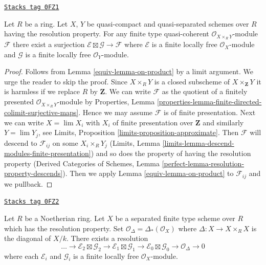\begin{lemma}
\label{equiv-lemma-on-product-general}
\href{https://stacks.math.columbia.edu/tag/0FZ1}{\texttt{Stacks tag 0FZ1}}

Let $R$ be a ring. Let $X$, $Y$ be quasi-compact and quasi-separated
schemes over $R$ having the resolution property. For any finite
type quasi-coherent $\mathcal{O}_{X \times_R Y}$-module $\mathcal{F}$
there exist a surjection $\mathcal{E} \boxtimes \mathcal{G} \to \mathcal{F}$
where $\mathcal{E}$ is a finite locally free $\mathcal{O}_X$-module
and $\mathcal{G}$ is a finite locally free $\mathcal{O}_Y$-module.
\end{lemma}

\begin{proof}

Follows from Lemma \ref{equiv-lemma-on-product} by a limit argument.
We urge the reader to skip the proof.
Since $X \times_R Y$ is a closed subscheme of $X \times_\mathbf{Z} Y$
it is harmless if we replace $R$ by $\mathbf{Z}$.
We can write $\mathcal{F}$ as the quotient of
a finitely presented $\mathcal{O}_{X \times_R Y}$-module by
Properties, Lemma
\ref{properties-lemma-finite-directed-colimit-surjective-maps}.
Hence we may assume $\mathcal{F}$ is of
finite presentation. Next we can write $X = \lim X_i$
with $X_i$ of finite presentation over $\mathbf{Z}$ and similarly
$Y = \lim Y_j$, see Limits, Proposition \ref{limits-proposition-approximate}.
Then $\mathcal{F}$ will descend to $\mathcal{F}_{ij}$ on some $X_i \times_R Y_j$
(Limits, Lemma \ref{limits-lemma-descend-modules-finite-presentation}) and
so does the property of having the resolution property
(Derived Categories of Schemes, Lemma
\ref{perfect-lemma-resolution-property-descends}).
Then we apply Lemma \ref{equiv-lemma-on-product}
to $\mathcal{F}_{ij}$ and we pullback.
\end{proof}

\begin{lemma}
\label{equiv-lemma-diagonal-resolution}
\href{https://stacks.math.columbia.edu/tag/0FZ2}{\texttt{Stacks tag 0FZ2}}

Let $R$ be a Noetherian ring. Let $X$ be a separated finite type scheme
over $R$ which has the resolution property. Set
$\mathcal{O}_\Delta = \Delta_*(\mathcal{O}_X)$ where
$\Delta : X \to X \times_R X$ is the diagonal of $X/k$.
There exists a resolution
$$
\ldots \to
\mathcal{E}_2 \boxtimes \mathcal{G}_2 \to
\mathcal{E}_1 \boxtimes \mathcal{G}_1 \to
\mathcal{E}_0 \boxtimes \mathcal{G}_0 \to
\mathcal{O}_\Delta \to 0
$$
where each $\mathcal{E}_i$ and $\mathcal{G}_i$ is a finite locally
free $\mathcal{O}_X$-module.
\end{lemma}

